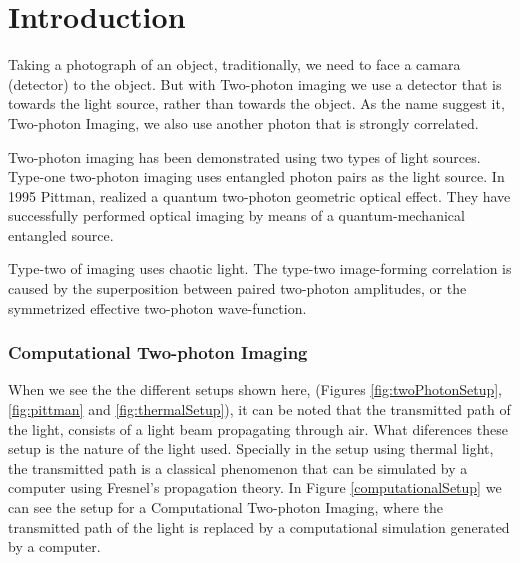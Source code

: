 
\chapter{Introduction} %

\label{Chapter1} %

Taking a photograph of an object, traditionally, we need to face a camara (detector) to the object. But with Two-photon imaging 
we use a detector that is towards the light source, rather than towards the object.
As the name suggest it, Two-photon Imaging, we also use another photon that is strongly correlated.
 

Two-photon imaging has been demonstrated using two types of light sources. Type-one
two-photon imaging uses entangled photon pairs as the light source. In 1995 Pittman, realized a 
quantum two-photon geometric optical effect.  They have successfully performed optical 
imaging by means of a quantum-mechanical entangled source\cite{pittman}.

Type-two of imaging uses chaotic light. The type-two  
image-forming correlation is caused by the superposition between paired two-photon amplitudes,
or the symmetrized effective two-photon wave-function\cite{physicsGhost}.


\subsection{Computational Two-photon Imaging}

When we see the the different setups shown here, (Figures \ref{fig:twoPhotonSetup}, \ref{fig:pittman} and \ref{fig:thermalSetup}),
it can be noted that the transmitted path of the light, consists of a light beam propagating through air. What diferences these setup is the nature of the light used.
Specially in the setup using thermal light, the transmitted path is a classical phenomenon that can be simulated by a computer using Fresnel's propagation theory.
In Figure \ref{computationalSetup} we can see the setup for a Computational
Two-photon Imaging, where the transmitted path of the light is replaced by a computational simulation generated by a computer.

